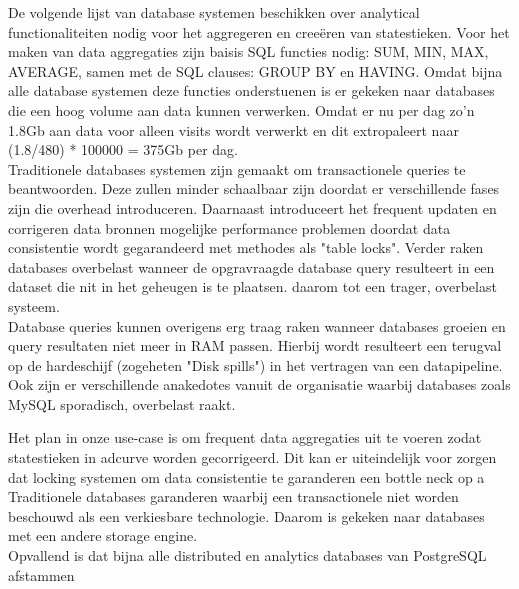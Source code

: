 
De volgende lijst van database systemen beschikken over analytical functionaliteiten nodig voor het aggregeren en creeëren van statestieken. Voor het maken van data aggregaties zijn baisis SQL functies nodig: SUM, MIN, MAX, AVERAGE, samen met de SQL clauses: GROUP BY en HAVING. Omdat bijna alle database systemen deze functies onderstuenen is er gekeken naar databases die een hoog volume aan data kunnen verwerken. 
Omdat er nu per dag zo'n 1.8Gb aan data voor alleen visits wordt verwerkt en dit extropaleert naar (1.8/480) * 100000 = 375Gb per dag. \\

Traditionele databases systemen zijn gemaakt om transactionele queries te beantwoorden. Deze zullen minder schaalbaar zijn doordat er verschillende fases zijn die overhead introduceren. \parencite{harizopoulos2008oltp}
Daarnaast introduceert het frequent updaten en corrigeren data bronnen mogelijke performance problemen doordat data consistentie wordt gegarandeerd met methodes als "table locks". Verder raken databases overbelast wanneer de opgravraagde database query resulteert in een dataset die nit in het geheugen is te plaatsen.  daarom tot een trager, overbelast systeem. \parencite{kersten2011researcher} \\

Database queries kunnen overigens erg traag raken wanneer databases groeien en query resultaten niet meer in RAM passen. Hierbij wordt resulteert een terugval op de hardeschijf (zogeheten "Disk spills") in het vertragen van een datapipeline. Ook zijn er verschillende anakedotes vanuit de organisatie waarbij databases zoals MySQL sporadisch, overbelast raakt.



Het plan in onze use-case is om frequent data aggregaties uit te voeren zodat statestieken in adcurve worden gecorrigeerd. Dit kan er uiteindelijk voor zorgen dat locking systemen om data consistentie te garanderen een bottle neck op a 
Traditionele databases garanderen waarbij een transactionele niet worden beschouwd als een verkiesbare technologie. Daarom is gekeken naar databases met een andere storage engine.  \\

Opvallend is dat bijna alle distributed en analytics databases van PostgreSQL afstammen \parencite{postgresforks}

